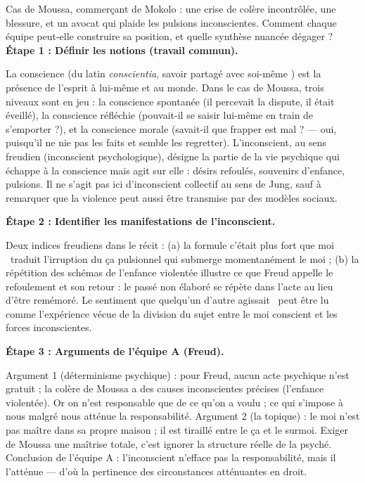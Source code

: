 \documentclass[11pt]{article}
\newcommand{\cle}[1]{{\popxbold\color{popdark}#1}}
\begin{document}
\begin{exoresolu}
Cas de Moussa, commerçant de Mokolo : une crise de colère incontrôlée, une blessure, et un avocat qui plaide les pulsions inconscientes. Comment chaque équipe peut-elle construire sa position, et quelle synthèse nuancée dégager ?
\tcblower
\textbf{Étape 1 : Définir les notions (travail commun).}

La \cle{conscience} (du latin \emph{conscientia}, \guillemotleft savoir partagé avec soi-même \guillemotright) est la présence de l'esprit à lui-même et au monde. Dans le cas de Moussa, trois niveaux sont en jeu : la conscience spontanée (il percevait la dispute, il était éveillé), la conscience réfléchie (pouvait-il se saisir lui-même en train de s'emporter ?), et la conscience morale (savait-il que frapper est mal ? — oui, puisqu'il ne nie pas les faits et semble les regretter). L'\cle{inconscient}, au sens freudien (inconscient psychologique), désigne la partie de la vie psychique qui échappe à la conscience mais agit sur elle : désirs refoulés, souvenirs d'enfance, pulsions. Il ne s'agit pas ici d'inconscient collectif au sens de Jung, sauf à remarquer que la violence peut aussi être transmise par des modèles sociaux.

\textbf{Étape 2 : Identifier les manifestations de l'inconscient.}

Deux indices freudiens dans le récit : (a) la formule \guillemotleft c'était plus fort que moi \guillemotright\ traduit l'irruption du ça pulsionnel qui submerge momentanément le moi ; (b) la répétition des schémas de l'enfance violentée illustre ce que Freud appelle le refoulement et son retour : le passé non élaboré se répète dans l'acte au lieu d'être remémoré. Le sentiment que \guillemotleft quelqu'un d'autre agissait \guillemotright\ peut être lu comme l'expérience vécue de la division du sujet entre le moi conscient et les forces inconscientes.

\textbf{Étape 3 : Arguments de l'équipe A (Freud).}

Argument 1 (déterminisme psychique) : pour Freud, aucun acte psychique n'est gratuit ; la colère de Moussa a des causes inconscientes précises (l'enfance violentée). Or on n'est responsable que de ce qu'on a voulu ; ce qui s'impose à nous malgré nous atténue la responsabilité. Argument 2 (la topique) : le moi \guillemotleft n'est pas maître dans sa propre maison \guillemotright ; il est tiraillé entre le ça et le surmoi. Exiger de Moussa une maîtrise totale, c'est ignorer la structure réelle de la psyché. Conclusion de l'équipe A : l'inconscient n'efface pas la responsabilité, mais il l'atténue — d'où la pertinence des circonstances atténuantes en droit.


\end{exoresolu}
\end{document}
